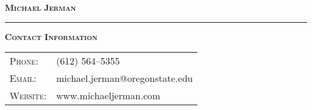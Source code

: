 \documentclass[12pt]{article}
\begin{document}
\hspace*{\fill} \textbf{\textsc{\Large Michael Jerman}} \hspace*{\fill}



\bigskip

\hrule

\bigskip

\noindent \textsc{\large \textbf{Contact Information}}

\bigskip

\noindent\begin{minipage}[t]{.49\textwidth}
\begin{tabular}{ll}
    \textsc{Phone:} & (612) 564--5355 \\
    \textsc{Email:} & michael.jerman@oregonstate.edu \\
    \textsc{Website:} & www.michaeljerman.com 
\end{tabular}
\end{minipage}
\hspace*{\fill}





\end{document}
